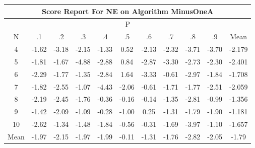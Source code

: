 \documentclass[11pt,a4paper]{report}
\begin{document}
\begin{longtable}{ | c || c | c | c | c | c | c | c | c | c || c |}
\hline
\multicolumn{11}{|c|}{ Score Report For NE on Algorithm MinusOneA} \\
\hline
\multicolumn{11}{|c|}{ P } \\
\hline
N & .1 & .2 & .3 & .4 & .5 & .6 & .7 & .8 & .9 & Mean\\
 \hline
 \hline
 \endhead
  4 &  \cellcolor[HTML]{FFD7D7} -1.62 &  \cellcolor[HTML]{FFAFAF} -3.18 &  \cellcolor[HTML]{FFC7C7} -2.15 &  \cellcolor[HTML]{FFDFDF} -1.33 &  \cellcolor[HTML]{EFEFFF} 0.52 &  \cellcolor[HTML]{FFC7C7} -2.13 &  \cellcolor[HTML]{FFC7C7} -2.32 &  \cellcolor[HTML]{FF9F9F} -3.71 &  \cellcolor[HTML]{FF9F9F} -3.70 & -2.179 \\
  5 &  \cellcolor[HTML]{FFCFCF} -1.81 &  \cellcolor[HTML]{FFD7D7} -1.67 &  \cellcolor[HTML]{FF8787} -4.88 &  \cellcolor[HTML]{FFB7B7} -2.88 &  \cellcolor[HTML]{E7E7FF} 0.84 &  \cellcolor[HTML]{FFB7B7} -2.87 &  \cellcolor[HTML]{FFAFAF} -3.30 &  \cellcolor[HTML]{FFB7B7} -2.73 &  \cellcolor[HTML]{FFC7C7} -2.30 & -2.401 \\
  6 &  \cellcolor[HTML]{FFC7C7} -2.29 &  \cellcolor[HTML]{FFCFCF} -1.77 &  \cellcolor[HTML]{FFDFDF} -1.35 &  \cellcolor[HTML]{FFB7B7} -2.84 &  \cellcolor[HTML]{D7D7FF} 1.64 &  \cellcolor[HTML]{FFAFAF} -3.33 &  \cellcolor[HTML]{FFEFEF} -0.61 &  \cellcolor[HTML]{FFB7B7} -2.97 &  \cellcolor[HTML]{FFCFCF} -1.84 & -1.708 \\
  7 &  \cellcolor[HTML]{FFCFCF} -1.82 &  \cellcolor[HTML]{FFBFBF} -2.55 &  \cellcolor[HTML]{FFE7E7} -1.07 &  \cellcolor[HTML]{FF8F8F} -4.43 &  \cellcolor[HTML]{FFC7C7} -2.06 &  \cellcolor[HTML]{FFEFEF} -0.61 &  \cellcolor[HTML]{FFD7D7} -1.71 &  \cellcolor[HTML]{FFCFCF} -1.77 &  \cellcolor[HTML]{FFBFBF} -2.51 & -2.059 \\
  8 &  \cellcolor[HTML]{FFC7C7} -2.19 &  \cellcolor[HTML]{FFBFBF} -2.45 &  \cellcolor[HTML]{FFCFCF} -1.76 &  \cellcolor[HTML]{FFF7F7} -0.36 &  \cellcolor[HTML]{FFFFFF} -0.16 &  \cellcolor[HTML]{FFFFFF} -0.14 &  \cellcolor[HTML]{FFDFDF} -1.35 &  \cellcolor[HTML]{FFB7B7} -2.81 &  \cellcolor[HTML]{FFE7E7} -0.99 & -1.356 \\
  9 &  \cellcolor[HTML]{FFDFDF} -1.42 &  \cellcolor[HTML]{FFC7C7} -2.09 &  \cellcolor[HTML]{FFE7E7} -1.09 &  \cellcolor[HTML]{FFF7F7} -0.28 &  \cellcolor[HTML]{FFE7E7} -1.00 &  \cellcolor[HTML]{F7F7FF} 0.25 &  \cellcolor[HTML]{FFDFDF} -1.31 &  \cellcolor[HTML]{FFCFCF} -1.79 &  \cellcolor[HTML]{FFCFCF} -1.90 & -1.181 \\
  10 &  \cellcolor[HTML]{FFBFBF} -2.62 &  \cellcolor[HTML]{FFDFDF} -1.34 &  \cellcolor[HTML]{FFD7D7} -1.48 &  \cellcolor[HTML]{FFCFCF} -1.84 &  \cellcolor[HTML]{FFEFEF} -0.56 &  \cellcolor[HTML]{FFF7F7} -0.31 &  \cellcolor[HTML]{FFD7D7} -1.69 &  \cellcolor[HTML]{FF9797} -3.97 &  \cellcolor[HTML]{FFE7E7} -1.10 & -1.657 \\
 \hline
 \hline
Mean &  \cellcolor[HTML]{FFCFCF} -1.97 &  \cellcolor[HTML]{FFC7C7} -2.15 &  \cellcolor[HTML]{FFCFCF} -1.97 &  \cellcolor[HTML]{FFCFCF} -1.99 &  \cellcolor[HTML]{FFFFFF} -0.11 &  \cellcolor[HTML]{FFDFDF} -1.31 &  \cellcolor[HTML]{FFCFCF} -1.76 &  \cellcolor[HTML]{FFB7B7} -2.82 &  \cellcolor[HTML]{FFCFCF} -2.05 &  \cellcolor[HTML]{FFCFCF} -1.79
\end{longtable}
\end{document}
